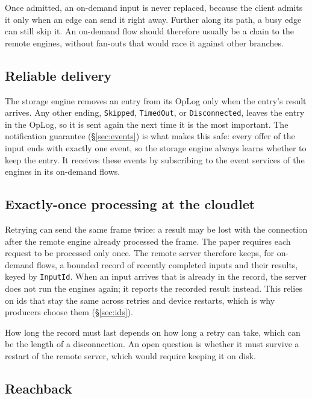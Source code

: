 \documentclass[11pt]{article}
\newcommand{\code}[1]{\texttt{#1}}
\begin{document}
Once admitted, an on-demand input is never replaced, because the client admits
it only when an edge can send it right away. Further along its path, a busy
edge can still skip it. An on-demand flow should therefore usually be a chain
to the remote engines, without fan-outs that would race it against other
branches.

\subsection{Reliable delivery}

The storage engine removes an entry from its OpLog only when the entry's
result arrives. Any other ending, \code{Skipped}, \code{TimedOut}, or
\code{Disconnected}, leaves the entry in the OpLog, so it is sent again the
next time it is the most important. The notification guarantee
(\S\ref{sec:events}) is what makes this safe: every offer of the input ends
with exactly one event, so the storage engine always learns whether to keep
the entry. It receives these events by subscribing to the event services of
the engines in its on-demand flows.

\subsection{Exactly-once processing at the cloudlet}

Retrying can send the same frame twice: a result may be lost with the
connection after the remote engine already processed the frame. The paper
requires each request to be processed only once. The remote server therefore
keeps, for on-demand flows, a bounded record of recently completed inputs and
their results, keyed by \code{InputId}. When an input arrives that is already
in the record, the server does not run the engines again; it reports the
recorded result instead. This relies on ids that stay the same across retries
and device restarts, which is why producers choose them (\S\ref{sec:ids}).

How long the record must last depends on how long a retry can take, which can
be the length of a disconnection. An open question is whether it must survive
a restart of the remote server, which would require keeping it on disk.

\subsection{Reachback}
\end{document}
